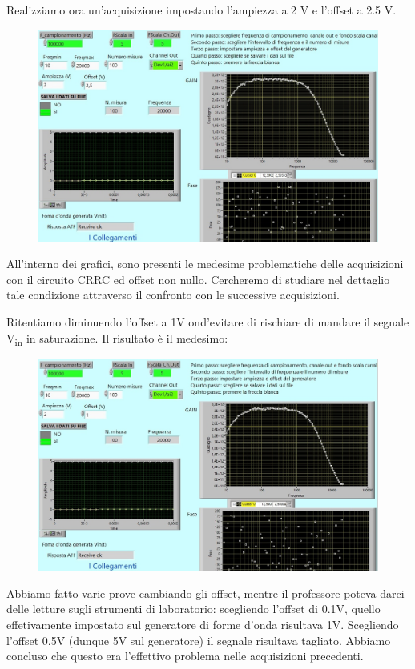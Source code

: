 Realizziamo ora un'acquisizione impostando l'ampiezza a 2 V e l'offset a 2.5 V.

\begin{figure}[H]
\caption{}
    \includegraphics[width=12cm]{settimana_2/immagini/rccr_8.jpg}
    \centering
\end{figure}

All'interno dei grafici, sono presenti le medesime problematiche delle acquisizioni con il circuito CRRC ed offset non nullo. Cercheremo di studiare nel dettaglio tale condizione attraverso il confronto con le successive acquisizioni.

Ritentiamo diminuendo l'offset a 1V ond'evitare di rischiare di mandare il segnale V\textsubscript{in} in saturazione. Il risultato è il medesimo:

\begin{figure}[H]
\caption{}
    \includegraphics[width=12cm]{settimana_2/immagini/rccr_9.jpg}
    \centering
\end{figure}

Abbiamo fatto varie prove cambiando gli offset, mentre il professore poteva darci delle letture sugli strumenti di laboratorio: scegliendo l'offset di 0.1V, quello effetivamente impostato sul generatore di forme d'onda risultava 1V. Scegliendo l'offset 0.5V (dunque 5V sul generatore) il segnale risultava tagliato. Abbiamo concluso che questo era l'effettivo problema nelle acquisizioni precedenti.

